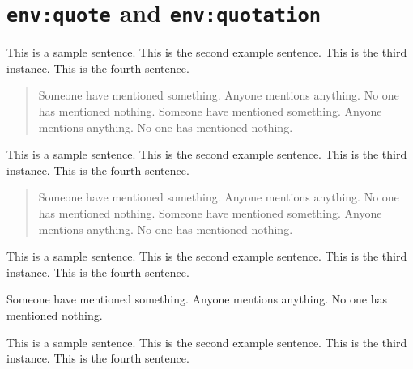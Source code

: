 \documentclass[amsmath,12pt]{revtex4-1}
\begin{document}
\section{{\tt env:quote} and {\tt env:quotation}}
This is a sample sentence.
This is the second example sentence.
This is the third instance.
This is the fourth sentence.
\begin{quote}
  Someone have mentioned something.
  Anyone mentions anything.
  No one has mentioned nothing.
  Someone have mentioned something.
  Anyone mentions anything.
  No one has mentioned nothing.
\end{quote}
This is a sample sentence.
This is the second example sentence.
This is the third instance.
This is the fourth sentence.
\begin{quotation}
  Someone have mentioned something.
  Anyone mentions anything.
  No one has mentioned nothing.
  Someone have mentioned something.
  Anyone mentions anything.
  No one has mentioned nothing.
\end{quotation}
This is a sample sentence.
This is the second example sentence.
This is the third instance.
This is the fourth sentence.
\begin{center}
  Someone have mentioned something.
  Anyone mentions anything.
  No one has mentioned nothing.
\end{center}
This is a sample sentence.
This is the second example sentence.
This is the third instance.
This is the fourth sentence.
\end{document}
